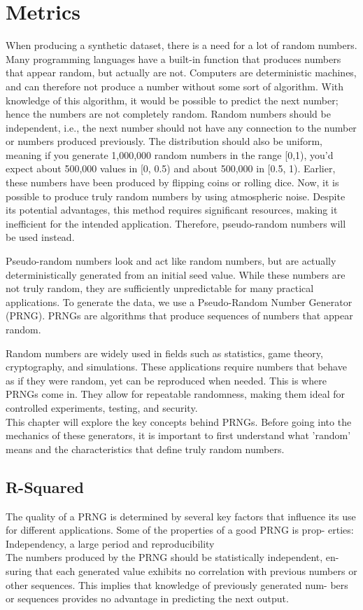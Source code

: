 
\section{Metrics}

When producing a synthetic dataset, there is a need for a lot of random numbers. Many programming languages have a built-in function that produces numbers that appear random, but actually are not. Computers are deterministic machines, and can therefore not produce a number without some sort of algorithm. With knowledge of this algorithm, it would be possible to predict the next number; hence the numbers are not completely random. Random numbers should be independent, i.e., the next number should not have any connection to the number or numbers produced previously. The distribution should also be uniform, meaning if you generate 1,000,000 random numbers in the range [0,1), you'd expect about 500,000 values in [0, 0.5) and about 500,000 in [0.5, 1). Earlier, these numbers have been produced by flipping coins or rolling dice. Now, it is possible to produce truly random numbers by using atmospheric noise. Despite its potential advantages, this method requires significant resources, making it inefficient for the intended application. Therefore, pseudo-random numbers will be used instead.

Pseudo-random numbers look and act like random numbers, but are actually deterministically generated from an initial seed value. While
these numbers are not truly random, they are sufficiently unpredictable for many practical applications.
To generate the data, we use a Pseudo-Random Number Generator (PRNG).
PRNGs are algorithms that produce sequences of numbers that appear random.


Random numbers are widely used in fields such as statistics, game theory, cryptography, and simulations. These applications require numbers that behave
as if they were random, yet can be reproduced when needed. This is where
PRNGs come in. They allow for repeatable randomness, making them ideal for
controlled experiments, testing, and security.
\\
This chapter will explore the key concepts behind PRNGs. Before going into the
mechanics of these generators, it is important to first understand what ’random’
means and the characteristics that define truly random numbers.

\subsection{R-Squared}

The quality of a PRNG is determined by several key factors that influence its
use for different applications. Some of the properties of a good PRNG is prop-
erties: Independency, a large period and reproducibility
\newline \\
The numbers produced by the PRNG should be statistically independent, en-
suring that each generated value exhibits no correlation with previous numbers
or other sequences. This implies that knowledge of previously generated num-
bers or sequences provides no advantage in predicting the next output.

